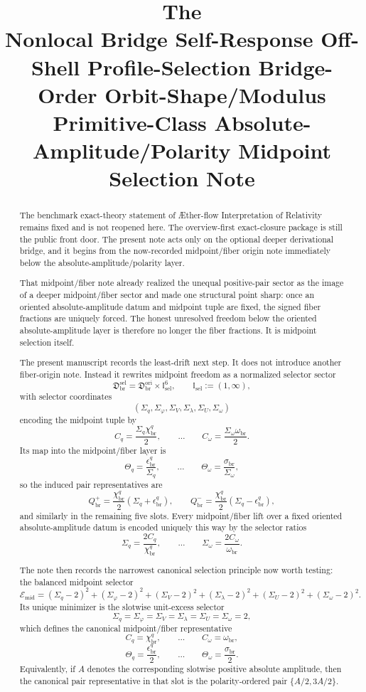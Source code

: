 \documentclass[11pt]{article}
\title{\textbf{The \TheoryName{}}\\[0.4em]
\large Nonlocal Bridge Self-Response Off-Shell Profile-Selection Bridge-Order Orbit-Shape/Modulus Primitive-Class Absolute-Amplitude/Polarity Midpoint Selection Note}
\author{}
\date{}
\newcommand{\Aflow}{\AE{}ther-flow}
\newcommand{\TheoryName}{\Aflow{} Interpretation of Relativity}
\newcommand{\OriginSector}{\mathfrak D_{\mathrm{br}}^{\mathrm{ori}}}
\newcommand{\AbsReadAmp}{\chi_{\mathrm{br}}^{q}}
\newcommand{\AbsScaleAmp}{\omega_{\mathrm{br}}}
\newcommand{\PolRead}{\epsilon_{\mathrm{br}}^{q}}
\newcommand{\PolScale}{\sigma_{\mathrm{br}}}
\newcommand{\PairReadPlus}{Q_{\mathrm{br}}^{+}}
\newcommand{\PairReadMinus}{Q_{\mathrm{br}}^{-}}
\newcommand{\MidRead}{C_{q}}
\newcommand{\MidScale}{C_{\omega}}
\newcommand{\FiberRead}{\Theta_{q}}
\newcommand{\FiberScale}{\Theta_{\omega}}
\newcommand{\MidSelSector}{\mathfrak D_{\mathrm{br}}^{\mathrm{sel}}}
\newcommand{\SelDom}{\mathbb I_{\mathrm{sel}}}
\newcommand{\SelRead}{\Sigma_{q}}
\newcommand{\SelCov}{\Sigma_{\varphi}}
\newcommand{\SelRelax}{\Sigma_{V}}
\newcommand{\SelWell}{\Sigma_{\lambda}}
\newcommand{\SelEq}{\Sigma_{U}}
\newcommand{\SelScale}{\Sigma_{\omega}}
\newcommand{\SelEnergy}{\mathscr E_{\mathrm{mid}}}
\begin{document}
\maketitle

\begin{abstract}
The benchmark exact-theory statement of \TheoryName{} remains fixed and is not reopened here. The overview-first exact-closure package is still the public front door. The present note acts only on the optional deeper derivational bridge, and it begins from the now-recorded midpoint/fiber origin note immediately below the absolute-amplitude/polarity layer.

That midpoint/fiber note already realized the unequal positive-pair sector as the image of a deeper midpoint/fiber sector and made one structural point sharp: once an oriented absolute-amplitude datum and midpoint tuple are fixed, the signed fiber fractions are uniquely forced. The honest unresolved freedom below the oriented absolute-amplitude layer is therefore no longer the fiber fractions. It is midpoint selection itself.

The present manuscript records the least-drift next step. It does not introduce another fiber-origin note. Instead it rewrites midpoint freedom as a normalized selector sector
\[
\MidSelSector
=
\OriginSector\times\SelDom^{6},
\qquad
\SelDom:=(1,\infty),
\]
with selector coordinates
\[
(\SelRead,\SelCov,\SelRelax,\SelWell,\SelEq,\SelScale)
\]
encoding the midpoint tuple by
\[
\MidRead=\frac{\SelRead\AbsReadAmp}{2},
\qquad
\ldots
\qquad
\MidScale=\frac{\SelScale\AbsScaleAmp}{2}.
\]
Its map into the midpoint/fiber layer is
\[
\FiberRead=\frac{\PolRead}{\SelRead},
\qquad
\ldots
\qquad
\FiberScale=\frac{\PolScale}{\SelScale},
\]
so the induced pair representatives are
\[
\PairReadPlus=\frac{\AbsReadAmp}{2}(\SelRead+\PolRead),
\qquad
\PairReadMinus=\frac{\AbsReadAmp}{2}(\SelRead-\PolRead),
\]
and similarly in the remaining five slots. Every midpoint/fiber lift over a fixed oriented absolute-amplitude datum is encoded uniquely this way by the selector ratios
\[
\SelRead=\frac{2\MidRead}{\AbsReadAmp},
\qquad
\ldots
\qquad
\SelScale=\frac{2\MidScale}{\AbsScaleAmp}.
\]

The note then records the narrowest canonical selection principle now worth testing: the balanced midpoint selector
\[
\SelEnergy
=
(\SelRead-2)^{2}
+(\SelCov-2)^{2}
+(\SelRelax-2)^{2}
+(\SelWell-2)^{2}
+(\SelEq-2)^{2}
+(\SelScale-2)^{2}.
\]
Its unique minimizer is the slotwise unit-excess selector
\[
\SelRead=\SelCov=\SelRelax=\SelWell=\SelEq=\SelScale=2,
\]
which defines the canonical midpoint/fiber representative
\[
\MidRead=\AbsReadAmp,
\qquad
\ldots
\qquad
\MidScale=\AbsScaleAmp,
\]
\[
\FiberRead=\frac{\PolRead}{2},
\qquad
\ldots
\qquad
\FiberScale=\frac{\PolScale}{2}.
\]
Equivalently, if \(A\) denotes the corresponding slotwise positive absolute amplitude, then the canonical pair representative in that slot is the polarity-ordered pair \(\{A/2,3A/2\}\).


\end{abstract}
\end{document}
